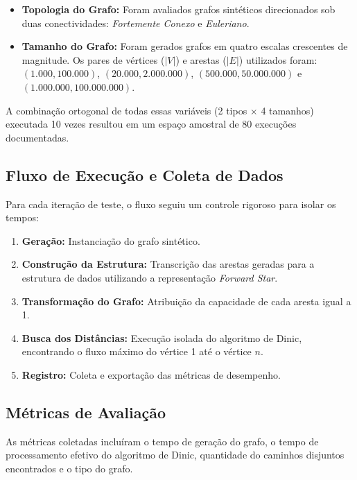 \documentclass[12pt]{article}
\begin{document}
\begin{itemize}
    \item \textbf{Topologia do Grafo:} Foram avaliados grafos sintéticos direcionados sob duas conectividades: \textit{Fortemente Conexo} e \textit{Euleriano}.
    
    \item \textbf{Tamanho do Grafo:} Foram gerados grafos em quatro escalas crescentes de magnitude. Os pares de vértices ($|V|$) e arestas ($|E|$) utilizados foram: $(1.000, 100.000)$, $(20.000, 2.000.000)$, $(500.000, 50.000.000)$ e $(1.000.000, 100.000.000)$.
\end{itemize}

A combinação ortogonal de todas essas variáveis (2 tipos $\times$ 4 tamanhos) executada 10 vezes resultou em um espaço amostral de 80 execuções documentadas.

\subsection{Fluxo de Execução e Coleta de Dados}

Para cada iteração de teste, o fluxo seguiu um controle rigoroso para isolar os tempos:

\begin{enumerate}
    \item \textbf{Geração:} Instanciação do grafo sintético.
    
    \item \textbf{Construção da Estrutura:} Transcrição das arestas geradas para a estrutura de dados utilizando a representação \textit{Forward Star}.
    
    \item \textbf{Transformação do Grafo:} Atribuição da capacidade de cada aresta igual a 1.

    \item \textbf{Busca dos Distâncias:} Execução isolada do algoritmo de Dinic, encontrando o fluxo máximo do vértice 1 até o vértice $n$.
    
    \item \textbf{Registro:} Coleta e exportação das métricas de desempenho.
\end{enumerate}

\subsection{Métricas de Avaliação}

As métricas coletadas incluíram o tempo de geração do grafo, o tempo de processamento efetivo do algoritmo de Dinic, quantidade do caminhos disjuntos encontrados e o tipo do grafo.
\end{document}
